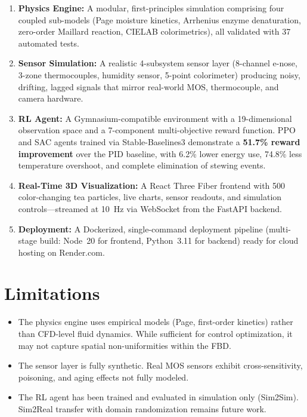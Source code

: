 ﻿\documentclass[12pt, a4paper]{report}
\begin{document}
\begin{enumerate}
    \item \textbf{Physics Engine:} A modular, first-principles simulation comprising four coupled sub-models (Page moisture kinetics, Arrhenius enzyme denaturation, zero-order Maillard reaction, CIELAB colorimetrics), all validated with 37 automated tests.

    \item \textbf{Sensor Simulation:} A realistic 4-subsystem sensor layer (8-channel e-nose, 3-zone thermocouples, humidity sensor, 5-point colorimeter) producing noisy, drifting, lagged signals that mirror real-world MOS, thermocouple, and camera hardware.

    \item \textbf{RL Agent:} A Gymnasium-compatible environment with a 19-dimensional observation space and a 7-component multi-objective reward function. PPO and SAC agents trained via Stable-Baselines3 demonstrate a \textbf{51.7\% reward improvement} over the PID baseline, with 6.2\% lower energy use, 74.8\% less temperature overshoot, and complete elimination of stewing events.

    \item \textbf{Real-Time 3D Visualization:} A React Three Fiber frontend with 500 color-changing tea particles, live charts, sensor readouts, and simulation controls---streamed at 10~Hz via WebSocket from the FastAPI backend.

    \item \textbf{Deployment:} A Dockerized, single-command deployment pipeline (multi-stage build: Node~20 for frontend, Python~3.11 for backend) ready for cloud hosting on Render.com.
\end{enumerate}

\section{Limitations}
\begin{itemize}
    \item The physics engine uses empirical models (Page, first-order kinetics) rather than CFD-level fluid dynamics. While sufficient for control optimization, it may not capture spatial non-uniformities within the FBD.
    \item The sensor layer is fully synthetic. Real MOS sensors exhibit cross-sensitivity, poisoning, and aging effects not fully modeled.
    \item The RL agent has been trained and evaluated in simulation only (Sim2Sim). Sim2Real transfer with domain randomization remains future work.
\end{itemize}
\end{document}
